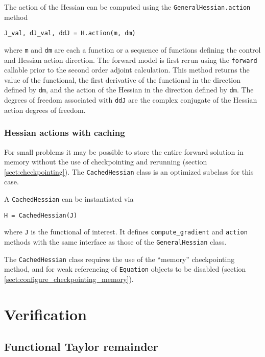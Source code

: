 \documentclass[11pt]{article}
\begin{document}
The action of the Hessian can be computed using the
\texttt{GeneralHessian.action} method
\begin{lstlisting}
J_val, dJ_val, ddJ = H.action(m, dm)
\end{lstlisting}
where \texttt{m} and \texttt{dm} are each a function or a sequence of functions
defining the control and Hessian action direction. The forward model is first
rerun using the \texttt{forward} callable prior to the second order adjoint
calculation. This method returns the value of the functional, the first
derivative of the functional in the direction defined by \texttt{dm}, and the
action of the Hessian in the direction defined by \texttt{dm}. The degrees of
freedom associated with \texttt{ddJ} are the complex conjugate of
the Hessian action degrees of freedom.

\subsubsection{Hessian actions with caching}

For small problems it may be possible to store the entire forward solution in
memory without the use of checkpointing and rerunning (section
\ref{sect:checkpointing}). The \texttt{CachedHessian} class is an optimized
subclass for this case.

A \texttt{CachedHessian} can be instantiated via
\begin{lstlisting}
H = CachedHessian(J)
\end{lstlisting}
where \texttt{J} is the functional of interest. It defines
\texttt{compute\_gradient} and \texttt{action} methods with the same interface
as those of the \texttt{GeneralHessian} class.

The \texttt{CachedHessian} class requires the use of the ``memory''
checkpointing method, and for weak referencing of \texttt{Equation} objects to
be disabled (section \ref{sect:configure_checkpointing_memory}).

\section{Verification}\label{sect:verification}

\subsection{Functional Taylor remainder}
\end{document}
